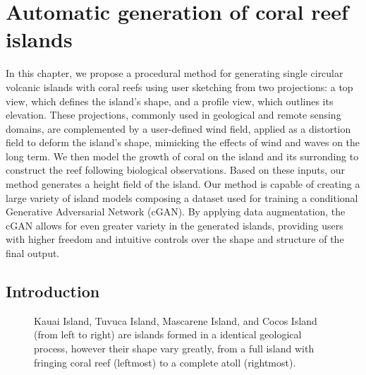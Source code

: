 \resetgraphicspath
{}


\chapter{Automatic generation of coral reef islands}
\label{chap:coral-island}

\abstract 
In this chapter, we propose a procedural method for generating single circular volcanic islands with coral reefs using user sketching from two projections: a top view, which defines the island's shape, and a profile view, which outlines its elevation. These projections, commonly used in geological and remote sensing domains, are complemented by a user-defined wind field, applied as a distortion field to deform the island's shape, mimicking the effects of wind and waves on the long term. We then model the growth of coral on the island and its surronding to construct the reef following biological observations. Based on these inputs, our method generates a height field of the island. Our method is capable of creating a large variety of island models composing a dataset used for training a conditional Generative Adversarial Network (cGAN). By applying data augmentation, the cGAN allows for even greater variety in the generated islands, providing users with higher freedom and intuitive controls over the shape and structure of the final output.
\pagebreak 

\minitoc


\section{Introduction}
\label{sec:coral-island_introduction}

\begin{figure}[H]
    \caption{Kauai Island, Tuvuca Island, Mascarene Island, and Cocos Island (from left to right) are islands formed in a identical geological process, however their shape vary greatly, from a full island with fringing coral reef (leftmost) to a complete atoll (rightmost).}
    \label{fig:coral-island_island-examples}
\end{figure}

